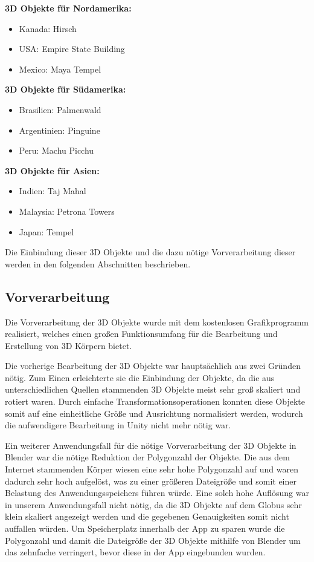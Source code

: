 \textbf{3D Objekte für Nordamerika:}
\begin{itemize}
\item Kanada: Hirsch
\item USA: Empire State Building
\item Mexico: Maya Tempel
\end{itemize}

\textbf{3D Objekte für Südamerika:}
\begin{itemize}
\item Brasilien: Palmenwald
\item Argentinien: Pinguine
\item Peru: Machu Picchu
\end{itemize}

\textbf{3D Objekte für Asien:}
\begin{itemize}
\item Indien: Taj Mahal
\item Malaysia: Petrona Towers
\item Japan: Tempel
\end{itemize}

Die Einbindung dieser 3D Objekte und die dazu nötige Vorverarbeitung dieser werden in den folgenden Abschnitten beschrieben.
\subsection{Vorverarbeitung}
Die Vorverarbeitung der 3D Objekte wurde mit dem kostenlosen Grafikprogramm  realisiert, welches einen großen Funktionsumfang für die Bearbeitung und Erstellung von 3D Körpern bietet. 

Die vorherige Bearbeitung der 3D Objekte war hauptsächlich aus zwei Gründen nötig. 
Zum Einen erleichterte sie die Einbindung der Objekte, da die aus unterschiedlichen Quellen stammenden 3D Objekte meist sehr groß skaliert und rotiert waren.
Durch einfache Transformationsoperationen konnten diese Objekte somit auf eine einheitliche Größe und Ausrichtung normalisiert werden, wodurch die aufwendigere Bearbeitung in Unity nicht mehr nötig war.

Ein weiterer Anwendungsfall für die nötige Vorverarbeitung der 3D Objekte in Blender war die nötige Reduktion der Polygonzahl der Objekte. 
Die aus dem Internet stammenden Körper wiesen eine sehr hohe Polygonzahl auf und waren dadurch sehr hoch aufgelöst, was zu einer größeren Dateigröße und somit einer Belastung des Anwendungsspeichers führen würde. 
Eine solch hohe Auflösung war in unserem Anwendungsfall nicht nötig, da die 3D Objekte auf dem Globus sehr klein skaliert angezeigt werden und die gegebenen Genauigkeiten somit nicht auffallen würden. 
Um Speicherplatz innerhalb der App zu sparen wurde die Polygonzahl und damit die Dateigröße der 3D Objekte mithilfe von Blender um das zehnfache verringert, bevor diese in der App eingebunden wurden.

